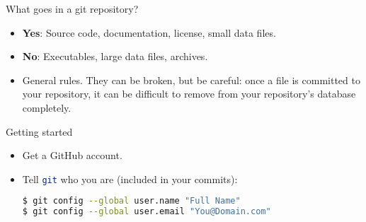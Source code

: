 \documentclass{beamer}
\newenvironment{myitemize}{
  \begin{itemize}
  \setlength{\itemsep}{5pt}
}{\end{itemize}}
\newcommand{\code}[1]{
  \lstinline[language=bash,basicstyle=\ttfamily]{#1}
}
\begin{document}
\begin{frame}[t,fragile]{What goes in a git repository?}
\begin{myitemize}
  \item<1->
    \textbf{Yes}: Source code, documentation, license, small data files.
  \item<2->
    \textbf{No}: Executables, large data files, archives.
  \item<3->
    General rules. They can be broken, but be careful: once a file is
    committed to your repository, it can be difficult to remove from your
    repository's database completely.
\end{myitemize}
\end{frame}

\begin{frame}[t,fragile]{Getting started}
\begin{myitemize}
  \item<1->
    Get a GitHub account.
  \item<2->
    Tell \code{git} who you are (included in your commits):
\begin{lstlisting}[language=bash]
$ git config --global user.name "Full Name"
$ git config --global user.email "You@Domain.com"
\end{lstlisting}
\end{myitemize}
\end{frame}
\end{document}
